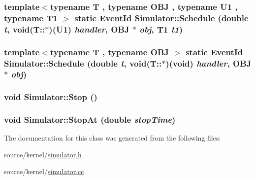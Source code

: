 \hypertarget{classSimulator_f483426f923de97d0f71ff88beceedbe}{
\subsubsection[{Schedule}]{\setlength{\rightskip}{0pt plus 5cm}template$<$typename T , typename OBJ , typename U1 , typename T1 $>$ static {\bf EventId} Simulator::Schedule (double {\em t}, \/  void(T::$\ast$)(U1) {\em handler}, \/  OBJ $\ast$ {\em obj}, \/  T1 {\em t1})}}
\label{classSimulator_f483426f923de97d0f71ff88beceedbe}


\hypertarget{classSimulator_2b4be0a76ed9915d4c1c861386d666bc}{
\subsubsection[{Schedule}]{\setlength{\rightskip}{0pt plus 5cm}template$<$typename T , typename OBJ $>$ static {\bf EventId} Simulator::Schedule (double {\em t}, \/  void(T::$\ast$)(void) {\em handler}, \/  OBJ $\ast$ {\em obj})}}
\label{classSimulator_2b4be0a76ed9915d4c1c861386d666bc}


\hypertarget{classSimulator_d493423e80256f53c715bb59c16ec78e}{
\subsubsection[{Stop}]{\setlength{\rightskip}{0pt plus 5cm}void Simulator::Stop ()}}
\label{classSimulator_d493423e80256f53c715bb59c16ec78e}


\hypertarget{classSimulator_5611e1169517890edfeeb33f91281dd8}{
\subsubsection[{StopAt}]{\setlength{\rightskip}{0pt plus 5cm}void Simulator::StopAt (double {\em stopTime})}}
\label{classSimulator_5611e1169517890edfeeb33f91281dd8}




The documentation for this class was generated from the following files:\begin{CompactItemize}
\item 
source/kernel/\hyperlink{simulator_8h}{simulator.h}\item 
source/kernel/\hyperlink{simulator_8cc}{simulator.cc}\end{CompactItemize}

